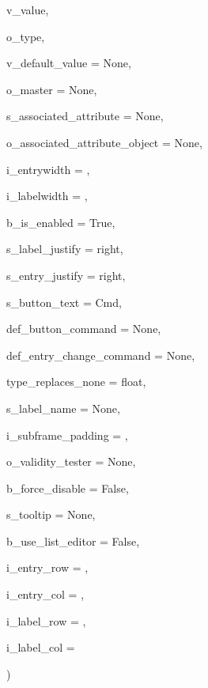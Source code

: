 {\begin{DoxyParamCaption}
\item[{}]{v\+\_\+value, }
\item[{}]{o\+\_\+type, }
\item[{}]{v\+\_\+default\+\_\+value = {\ttfamily None}, }
\item[{}]{o\+\_\+master = {\ttfamily None}, }
\item[{}]{s\+\_\+associated\+\_\+attribute = {\ttfamily None}, }
\item[{}]{o\+\_\+associated\+\_\+attribute\+\_\+object = {\ttfamily None}, }
\item[{}]{i\+\_\+entrywidth = {}, }
\item[{}]{i\+\_\+labelwidth = {}, }
\item[{}]{b\+\_\+is\+\_\+enabled = {\ttfamily True}, }
\item[{}]{s\+\_\+label\+\_\+justify = {\ttfamily \textquotesingle{}right\textquotesingle{}}, }
\item[{}]{s\+\_\+entry\+\_\+justify = {\ttfamily \textquotesingle{}right\textquotesingle{}}, }
\item[{}]{s\+\_\+button\+\_\+text = {\ttfamily \textquotesingle{}Cmd\textquotesingle{}}, }
\item[{}]{def\+\_\+button\+\_\+command = {\ttfamily None}, }
\item[{}]{def\+\_\+entry\+\_\+change\+\_\+command = {\ttfamily None}, }
\item[{}]{type\+\_\+replaces\+\_\+none = {\ttfamily float}, }
\item[{}]{s\+\_\+label\+\_\+name = {\ttfamily None}, }
\item[{}]{i\+\_\+subframe\+\_\+padding = {}, }
\item[{}]{o\+\_\+validity\+\_\+tester = {\ttfamily None}, }
\item[{}]{b\+\_\+force\+\_\+disable = {\ttfamily False}, }
\item[{}]{s\+\_\+tooltip = {\ttfamily None}, }
\item[{}]{b\+\_\+use\+\_\+list\+\_\+editor = {\ttfamily False}, }
\item[{}]{i\+\_\+entry\+\_\+row = {}, }
\item[{}]{i\+\_\+entry\+\_\+col = {}, }
\item[{}]{i\+\_\+label\+\_\+row = {}, }
\item[{}]{i\+\_\+label\+\_\+col = {}}
\end{DoxyParamCaption}
)}\hypertarget{classnegui_1_1pgkeyvalueframe_1_1KeyValFrame_a8c2ff5749913d769fe35bb0022d92321}{}\label{classnegui_1_1pgkeyvalueframe_1_1KeyValFrame_a8c2ff5749913d769fe35bb0022d92321}
